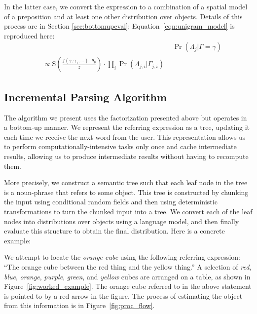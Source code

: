 \documentclass[conference]{IEEEtran}
\numberwithin{equation}{section}
\begin{document}
In the latter case, we convert the expression to a combination of a spatial model of a preposition and at least one other distribution over objects. Details of this process are in Section \ref{sec:bottomupeval}; Equation~\ref{eqn:unigram_model} is reproduced here:
\begin{align*}
   & \Pr(\Lambda_j | \Gamma = \gamma)
\\[7pt] \begin{split}
   & \propto \text{S}\left( \frac{f(\gamma, \gamma_1, \ldots) \cdot \theta_p}{z} \right) \cdot \prod_i \Pr(\Lambda_{j,i}|\Gamma_{j,i})
\end{split}
\end{align*}


\subsection{Incremental Parsing Algorithm}

The algorithm we present uses the factorization presented above but operates in a bottom-up manner. We represent the referring expression as a tree, updating it each time we receive the next word from the user. This representation allows us to perform computationally-intensive tasks only once and cache intermediate results, allowing us to produce intermediate results without having to recompute them.

More precisely, we construct a semantic tree such that each leaf node in the tree is a noun-phrase that refers to some object. This tree is constructed by chunking the input using conditional random fields and then using deterministic transformations to turn the chunked input into a tree. We convert each of the leaf nodes into distributions over objects using a language model, and then finally evaluate this structure to obtain the final distribution. Here is a concrete example: 

We attempt to locate the \textit{orange cube} using the following referring expression: ``The orange cube between the red thing and the yellow thing.'' A selection of \textit{red}, \textit{blue}, \textit{orange}, \textit{purple}, \textit{green}, and  \textit{yellow} cubes are arranged on a table, as shown in Figure~\ref{fig:worked_example}. The orange cube referred to in the above statement is pointed to by a red arrow in the figure. The process of estimating the object from this information is in Figure~\ref{fig:proc_flow}.
\end{document}
